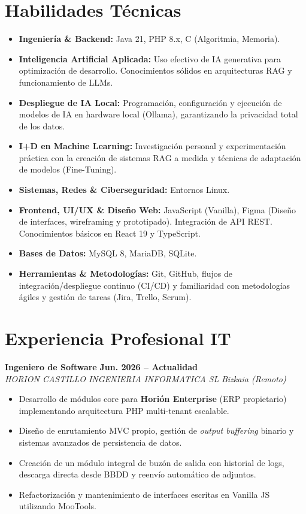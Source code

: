 \documentclass[a4paper,10pt]{article}
\newcommand{\jobheader}[4]{
    \noindent\textbf{#1} \hfill \textbf{#2} \\
    \textit{#3} \hfill \textit{#4} \vspace{3pt}
}
\begin{document}
\section{Habilidades Técnicas}
\begin{itemize}[leftmargin=0pt, label={}, itemsep=3pt, topsep=4pt]
    \item \textbf{Ingeniería \& Backend:} Java 21, PHP 8.x, C (Algoritmia, Memoria).
    \item \textbf{Inteligencia Artificial Aplicada:} Uso efectivo de IA generativa para optimización de desarrollo. Conocimientos sólidos en arquitecturas RAG y funcionamiento de LLMs.
    \item \textbf{Despliegue de IA Local:} Programación, configuración y ejecución de modelos de IA en hardware local (Ollama), garantizando la privacidad total de los datos.
    \item \textbf{I+D en Machine Learning:} Investigación personal y experimentación práctica con la creación de sistemas RAG a medida y técnicas de adaptación de modelos (Fine-Tuning).
    \item \textbf{Sistemas, Redes \& Ciberseguridad:} Entornos Linux.
    \item \textbf{Frontend, UI/UX \& Diseño Web:} JavaScript (Vanilla), Figma (Diseño de interfaces, wireframing y prototipado). Integración de API REST. Conocimientos básicos en React 19 y TypeScript.
    \item \textbf{Bases de Datos:} MySQL 8, MariaDB, SQLite.
    \item \textbf{Herramientas \& Metodologías:} Git, GitHub, flujos de integración/despliegue continuo (CI/CD) y familiaridad con metodologías ágiles y gestión de tareas (Jira, Trello, Scrum).
\end{itemize}

\section{Experiencia Profesional IT}

\jobheader{Ingeniero de Software}{Jun. 2026 -- Actualidad}{HORION CASTILLO INGENIERIA INFORMATICA SL}{Bizkaia (Remoto)}
\begin{itemize}[leftmargin=12pt, itemsep=3pt, topsep=4pt]
    \item Desarrollo de módulos core para \textbf{Horión Enterprise} (ERP propietario) implementando arquitectura PHP multi-tenant escalable.
    \item Diseño de enrutamiento MVC propio, gestión de \textit{output buffering} binario y sistemas avanzados de persistencia de datos.
    \item Creación de un módulo integral de buzón de salida con historial de logs, descarga directa desde BBDD y reenvío automático de adjuntos.
    \item Refactorización y mantenimiento de interfaces escritas en Vanilla JS utilizando MooTools.
\end{itemize}
\end{document}
